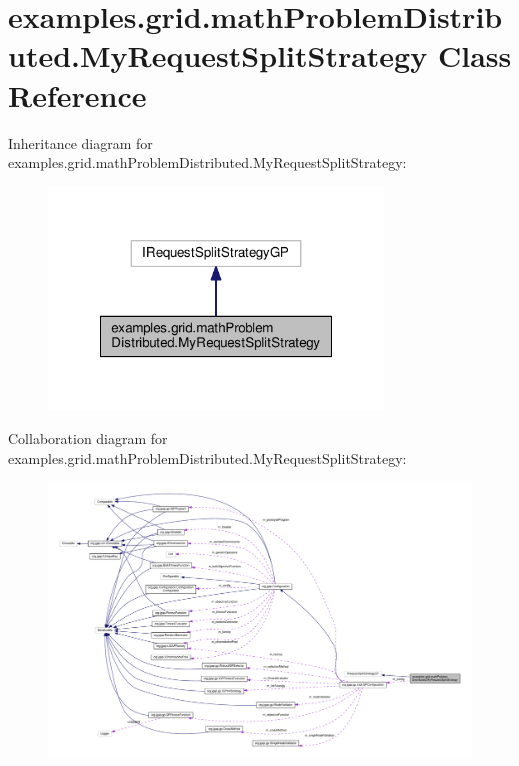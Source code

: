 \hypertarget{classexamples_1_1grid_1_1math_problem_distributed_1_1_my_request_split_strategy}{\section{examples.\-grid.\-math\-Problem\-Distributed.\-My\-Request\-Split\-Strategy Class Reference}
\label{classexamples_1_1grid_1_1math_problem_distributed_1_1_my_request_split_strategy}
}


Inheritance diagram for examples.\-grid.\-math\-Problem\-Distributed.\-My\-Request\-Split\-Strategy\-:
\nopagebreak
\begin{figure}[H]
\begin{center}
\leavevmode
\includegraphics[width=252pt]{classexamples_1_1grid_1_1math_problem_distributed_1_1_my_request_split_strategy__inherit__graph}
\end{center}
\end{figure}


Collaboration diagram for examples.\-grid.\-math\-Problem\-Distributed.\-My\-Request\-Split\-Strategy\-:
\nopagebreak
\begin{figure}[H]
\begin{center}
\leavevmode
\includegraphics[width=350pt]{classexamples_1_1grid_1_1math_problem_distributed_1_1_my_request_split_strategy__coll__graph}
\end{center}
\end{figure}
